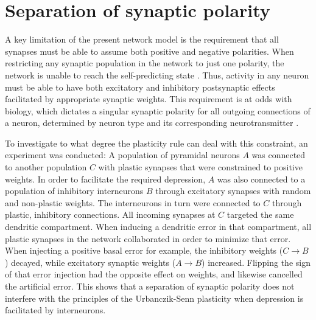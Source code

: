 \section{Separation of synaptic polarity}

A key limitation of the present network model is the requirement that all synapses must be able to assume both positive
and negative polarities. When restricting any synaptic population in the network to just one polarity, the network is
unable to reach the self-predicting state . Thus, activity in any neuron must be able to have both
excitatory and inhibitory postsynaptic effects facilitated by appropriate synaptic weights. This requirement is at odds
with biology, which dictates a singular synaptic polarity for all outgoing connections of a neuron, determined by neuron
type and its corresponding neurotransmitter \citeme.


To investigate to what degree the plasticity rule can deal with this constraint, an experiment was conducted: A
 population of pyramidal neurons $A$  was connected to another population $C$ with plastic synapses that were
 constrained to positive weights. In order to facilitate the required depression, $A$ was also connected to a population
 of inhibitory interneurons $B$ through excitatory synapses with random and non-plastic weights. The interneurons in
 turn were connected to $C$ through plastic, inhibitory connections. All incoming synapses at $C$ targeted the same
 dendritic compartment. When inducing a dendritic error in that compartment, all plastic synapses in the network
 collaborated in order to minimize that error. When injecting a positive basal error for example, the inhibitory weights
 ($C \rightarrow B$) decayed, while excitatory synaptic weights ($A \rightarrow B$) increased. Flipping the sign of that
 error injection had the opposite effect on weights, and likewise cancelled the artificial error. This shows that a
 separation of synaptic polarity does not interfere with the principles of the Urbanczik-Senn plasticity when depression
 is facilitated by interneurons.

